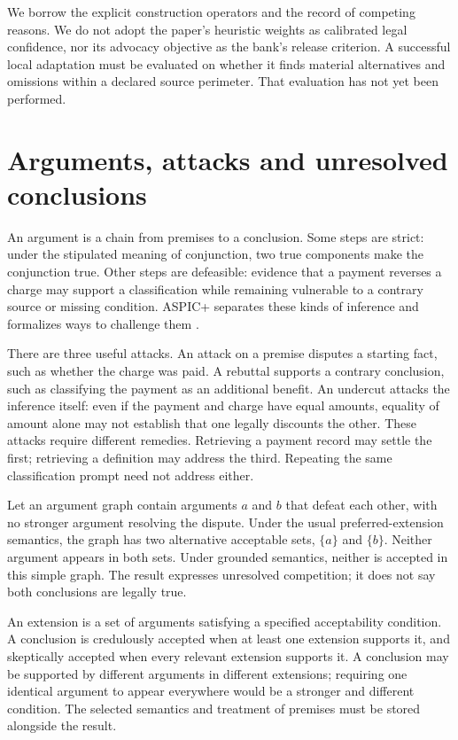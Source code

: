 We borrow the explicit construction operators and the record of competing
reasons. We do not adopt the paper's heuristic weights as calibrated legal
confidence, nor its advocacy objective as the bank's release criterion. A
successful local adaptation must be evaluated on whether it finds material
alternatives and omissions within a declared source perimeter. That evaluation
has not yet been performed.

\section{Arguments, attacks and unresolved conclusions}

An argument is a chain from premises to a conclusion. Some steps are strict:
under the stipulated meaning of conjunction, two true components make the
conjunction true. Other steps are defeasible: evidence that a payment reverses a
charge may support a classification while remaining vulnerable to a contrary
source or missing condition. ASPIC+ separates these kinds of inference and
formalizes ways to challenge them \citep[sections 2--3]{aspic2010}.

There are three useful attacks. An attack on a premise disputes a starting fact,
such as whether the charge was paid. A rebuttal supports a contrary conclusion,
such as classifying the payment as an additional benefit. An undercut attacks the
inference itself: even if the payment and charge have equal amounts, equality of
amount alone may not establish that one legally discounts the other. These
attacks require different remedies. Retrieving a payment record may settle the
first; retrieving a definition may address the third. Repeating the same
classification prompt need not address either.

Let an argument graph contain arguments $a$ and $b$ that defeat each other, with
no stronger argument resolving the dispute. Under the usual preferred-extension
semantics, the graph has two alternative acceptable sets, $\{a\}$ and $\{b\}$.
Neither argument appears in both sets. Under grounded semantics, neither is
accepted in this simple graph. The result expresses unresolved competition; it
does not say both conclusions are legally true.

An extension is a set of arguments satisfying a specified acceptability
condition. A conclusion is credulously accepted when at least one extension
supports it, and skeptically accepted when every relevant extension supports it.
A conclusion may be supported by different arguments in different extensions;
requiring one identical argument to appear everywhere would be a stronger and
different condition. The selected semantics and treatment of premises must be
stored alongside the result.

